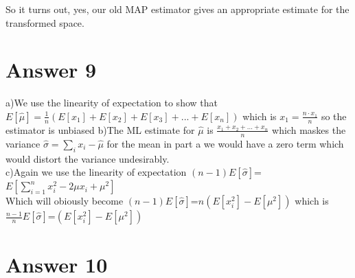 \documentclass[12pt]{article}
\begin{document}
So it turns out, yes, our old MAP estimator gives an appropriate estimate for the transformed space.












\section*{Answer 9}


a)We use the linearity of expectation to show that $ E[\hat{\mu}]=\frac{1}{n}(E[x_{1}]+E[x_{2}]+E[x_{3}]+...+E[x_{n}])$ which is $x_{1}=\frac{n\cdot x_{1}}{n}$ so the estimator is unbiased
b)The ML estimate for $\hat{\mu}$ is $\frac{x_{1}+x_{2}+...+x_{n}}{n}$ which maskes the variance $\hat{\sigma}=\sum_{i} x_{i}-\hat{\mu}$ for the mean in part a we would have a zero term which would distort the variance undesirably.\\
c)Again we use the linearity of expectation $(n-1)E[\hat{\sigma}]$=$E[\sum_{i=1}^{n}x_{i}^{2}-2\mu x_{i} +\mu^{2}]$\\
Which will obiously become $(n-1)E[\hat{\sigma}]$=$n(E[x_{i}^{2}]-E[\mu^{2}])$ which is $\frac{n-1}{n} E[\hat{\sigma}]$=$(E[x_{i}^{2}]-E[\mu^{2}])$







\section*{Answer 10}
\end{document}
